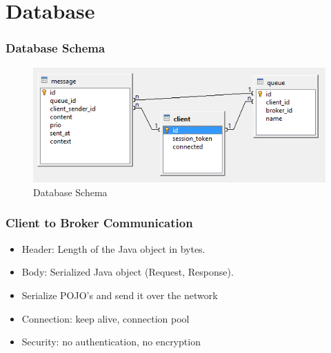 \documentclass{beamer}
\begin{document}
\section{Database}
\begin{frame}
\frametitle{Database Schema}

\begin{figure}
  \begin{center}
    \includegraphics[scale=0.42]{../../database/db-schema.png}
  \end{center}
  \caption{Database Schema}
  \label{fig:db-schema}
\end{figure}
\end{frame}


\begin{frame}
\frametitle{Client to Broker Communication}

\begin{itemize}
\item Header: Length of the Java object in bytes.
\item Body: Serialized Java object (Request, Response).
\item Serialize POJO's and send it over the network
\item Connection: keep alive, connection pool
\item Security: no authentication, no encryption
\end{itemize}
\end{frame}

\end{document}
